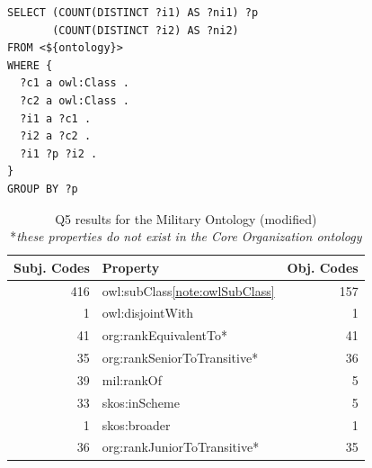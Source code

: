 \begin{lstlisting}[captionpos=b, caption=Q5 -- Query to get list of properties that connect class instances and the number of instances on both sides,label=lst:sparql5,basicstyle=\ttfamily,frame=single]
SELECT (COUNT(DISTINCT ?i1) AS ?ni1) ?p 
       (COUNT(DISTINCT ?i2) AS ?ni2)
FROM <${ontology}> 
WHERE {
  ?c1 a owl:Class .
  ?c2 a owl:Class .
  ?i1 a ?c1 .
  ?i2 a ?c2 .
  ?i1 ?p ?i2 .
}
GROUP BY ?p
\end{lstlisting}


\begin{table}[h]
\footnotesize
\centering
\begin{tabular}{|r|l|r|}
\hline
\textbf{Subj. Codes}       & \textbf{Property}                   & \textbf{Obj. Codes}       \\ \hline
416                        & owl:subClass\cref{note:owlSubClass} & 157                       \\ \hline
1                          & owl:disjointWith                    & 1                         \\ \hline
41                         & org:rankEquivalentTo*               & 41                        \\ \hline
35                         & org:rankSeniorToTransitive*         & 36                        \\ \hline
39                         & mil:rankOf                          & 5                         \\ \hline
33                         & skos:inScheme                       & 5                         \\ \hline
1                          & skos:broader                        & 1                         \\ \hline
36                         & org:rankJuniorToTransitive*         & 35                        \\ \hline
\end{tabular}
\footnotesize
\caption{Q5 results for the Military Ontology (modified)\\ \**\textit{these properties do not exist in the Core Organization ontology}} \label{tab:q5-results}
\end{table}



